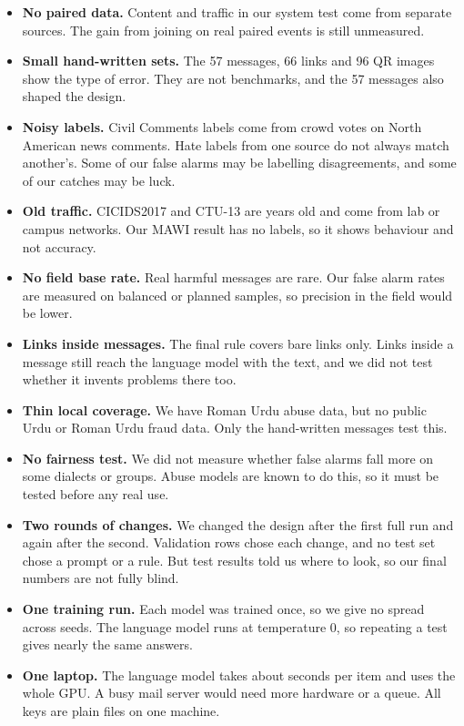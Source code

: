 \begin{itemize}
  \item \textbf{No paired data.} Content and traffic in our system test come from separate sources. The gain from joining on real paired events is still unmeasured.
  \item \textbf{Small hand-written sets.} The 57 messages, 66 links and 96 QR images show the type of error. They are not benchmarks, and the 57 messages also shaped the design.
  \item \textbf{Noisy labels.} Civil Comments labels come from crowd votes on North American news comments. Hate labels from one source do not always match another's. Some of our false alarms may be labelling disagreements, and some of our catches may be luck.
  \item \textbf{Old traffic.} CICIDS2017 and CTU-13 are years old and come from lab or campus networks. Our MAWI result has no labels, so it shows behaviour and not accuracy.
  \item \textbf{No field base rate.} Real harmful messages are rare. Our false alarm rates are measured on balanced or planned samples, so precision in the field would be lower.
  \item \textbf{Links inside messages.} The final rule covers bare links only. Links inside a message still reach the language model with the text, and we did not test whether it invents problems there too.
  \item \textbf{Thin local coverage.} We have Roman Urdu abuse data, but no public Urdu or Roman Urdu fraud data. Only the hand-written messages test this.
  \item \textbf{No fairness test.} We did not measure whether false alarms fall more on some dialects or groups. Abuse models are known to do this, so it must be tested before any real use.
  \item \textbf{Two rounds of changes.} We changed the design after the first full run and again after the second. Validation rows chose each change, and no test set chose a prompt or a rule. But test results told us where to look, so our final numbers are not fully blind.
  \item \textbf{One training run.} Each model was trained once, so we give no spread across seeds. The language model runs at temperature 0, so repeating a test gives nearly the same answers.
  \item \textbf{One laptop.} The language model takes about \sampleSeconds{} seconds per item and uses the whole GPU. A busy mail server would need more hardware or a queue. All keys are plain files on one machine.
\end{itemize}

